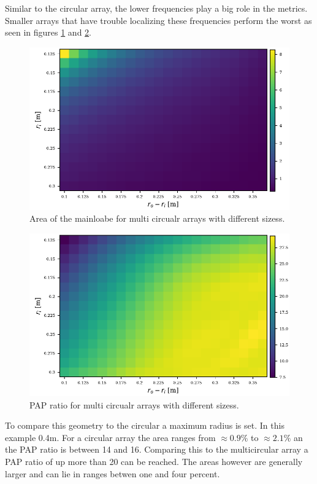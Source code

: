 Similar to the circular array, the lower frequencies play a big role in the metrics.
Smaller arrays that have trouble localizing these frequencies perform the worst as seen
in figures \ref*{aev:fig:FancyArea} and \ref*{aev:fig:FancyPap}.

\begin{figure}
	\centering
	\includegraphics[]{images/5_array_evaluation/fancy_area.pdf}
	\caption{Area of the mainloabe for multi circualr arrays with different
	sizess.}
	\label{aev:fig:FancyArea}
\end{figure}

\begin{figure}
	\centering
	\includegraphics[]{images/5_array_evaluation/fancy_pap.pdf}
	\caption{PAP ratio for multi circualr arrays with different
	sizess.}
	\label{aev:fig:FancyPap}
\end{figure}

To compare this geometry to the circular a maximum radius is set.
In this example 0.4m. 
For a circular array the area ranges from $\approx 0.9\%$ to 
$\approx 2.1\%$ an the PAP ratio is between 14 and 16.
Comparing this to the multicircular array a PAP ratio of up
more than 20 can be reached. 
The areas however are generally larger and can lie in ranges 
betwen one and four percent.

